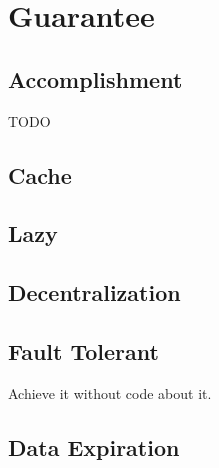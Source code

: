 
\section{Guarantee} %
\label{sec:guarantee}

\subsection{Accomplishment} %
\label{sub:accomplishment}
TODO

\subsection{Cache} %
\label{sub:cache}


\subsection{Lazy} %
\label{sub:lazy}


\subsection{Decentralization} %
\label{sub:decentralization}


\subsection{Fault Tolerant} %
\label{sub:fault_tolerant}
Achieve it without code about it.

\subsection{Data Expiration} %
\label{sub:data_expiration}



